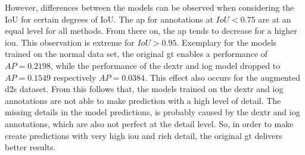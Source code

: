 However, differences between the models can be observed when considering the IoU for certain degrees of IoU.
The \gls{ap} for annotations at $ IoU < 0.75 $ are at an equal level for all methods.
From there on, the \gls{ap} tends to decrease for a higher \gls{iou}.
This observation is extreme for $ IoU > 0.95 $. 
Exemplary for the models trained on the normal data set, the original \gls{gt} enables a performance of $ AP = 0.2198 $, while the performance of the \gls{dextr} and \gls{iog} model dropped to $ AP = 0.1549 $ respectively $ AP = 0.0384 $.
This effect also occurs for the augmented \gls{d2s} dataset.
From this follows that, the models trained on the \gls{dextr} and \gls{iog} annotations are not able to make prediction with a high level of detail.
The missing details in the model predictions, is probably caused by the \gls{dextr} and \gls{iog} annotations, which are also not perfect at the detail level.
So, in order to make create predictions with very high \gls{iou} and rich detail, the original \gls{gt} delivers better results.


